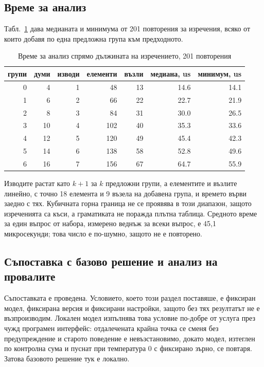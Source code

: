\subsection{Време за анализ}

Табл.~\ref{tab:parsetime} дава медианата и минимума от 201 повторения за изречения, всяко
от които добавя по една предложна група към предходното.

\begin{table}[H]
\caption{Време за анализ спрямо дължината на изречението, 201 повторения}
\label{tab:parsetime}
\centering
\begin{tabular}{@{}rrrrrrr@{}}
\toprule
\textbf{групи} & \textbf{думи} & \textbf{изводи} & \textbf{елементи} & \textbf{възли} & \textbf{медиана, us} & \textbf{минимум, us} \\
\midrule
0 &  4 & 1 &  48 & 13 & 14.6 & 14.1 \\
1 &  6 & 2 &  66 & 22 & 22.7 & 21.9 \\
2 &  8 & 3 &  84 & 31 & 30.0 & 26.5 \\
3 & 10 & 4 & 102 & 40 & 35.3 & 33.6 \\
4 & 12 & 5 & 120 & 49 & 45.4 & 42.3 \\
5 & 14 & 6 & 138 & 58 & 52.8 & 49.6 \\
6 & 16 & 7 & 156 & 67 & 64.7 & 55.9 \\
\bottomrule
\end{tabular}
\end{table}

Изводите растат като $k+1$ за $k$ предложни групи, а елементите и възлите линейно, с точно
18 елемента и 9 възела на добавена група, и времето върви заедно с тях. Кубичната горна
граница не се проявява в този диапазон, защото изреченията са къси, а граматиката не
поражда плътна таблица. Средното време за един въпрос от набора, измерено веднъж за всеки
въпрос, е 45,1 микросекунди; това число е по-шумно, защото не е повторено.

\subsection{Съпоставка с базово решение и анализ на провалите}

Съпоставката е проведена. Условието, което този раздел поставяше, е фиксиран модел,
фиксирана версия и фиксирани настройки, защото без тях резултатът не е възпроизводим.
Локален модел изпълнява това условие по-добре от услуга през чужд програмен интерфейс:
отдалечената крайна точка се сменя без предупреждение и старото поведение е
невъзстановимо, докато модел, изтеглен по контролна сума и пуснат при температура 0 с
фиксирано зърно, се повтаря. Затова базовото решение тук е локално.

